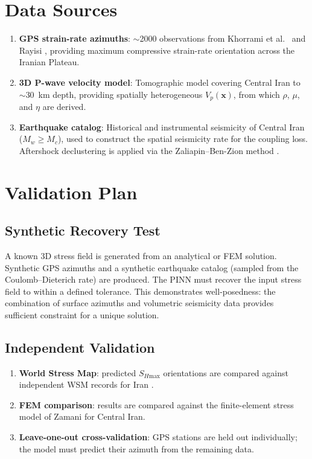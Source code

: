 \documentclass[11pt, a4paper]{article}
\begin{document}
\section{Data Sources}

\begin{enumerate}
    \item \textbf{GPS strain-rate azimuths}: $\sim$2000 observations from Khorrami et al.\ \cite{Khorrami2019} and Rayisi \cite{Rayisi2016}, providing maximum compressive strain-rate orientation across the Iranian Plateau.
    \item \textbf{3D P-wave velocity model}: Tomographic model covering Central Iran to $\sim$30~km depth, providing spatially heterogeneous $V_p(\mathbf{x})$, from which $\rho$, $\mu$, and $\eta$ are derived.
    \item \textbf{Earthquake catalog}: Historical and instrumental seismicity of Central Iran ($M_w \geq M_c$), used to construct the spatial seismicity rate for the coupling loss. Aftershock declustering is applied via the Zaliapin--Ben-Zion method \cite{Zaliapin2008}.
\end{enumerate}

\section{Validation Plan}

\subsection{Synthetic Recovery Test}
A known 3D stress field is generated from an analytical or FEM solution. Synthetic GPS azimuths and a synthetic earthquake catalog (sampled from the Coulomb--Dieterich rate) are produced. The PINN must recover the input stress field to within a defined tolerance. This demonstrates well-posedness: the combination of surface azimuths and volumetric seismicity data provides sufficient constraint for a unique solution.

\subsection{Independent Validation}
\begin{enumerate}
    \item \textbf{World Stress Map}: predicted $S_{H\text{max}}$ orientations are compared against independent WSM records for Iran \cite{Heidbach2018}.
    \item \textbf{FEM comparison}: results are compared against the finite-element stress model of Zamani \cite{Zamani2017} for Central Iran.
    \item \textbf{Leave-one-out cross-validation}: GPS stations are held out individually; the model must predict their azimuth from the remaining data.
\end{enumerate}
\end{document}
